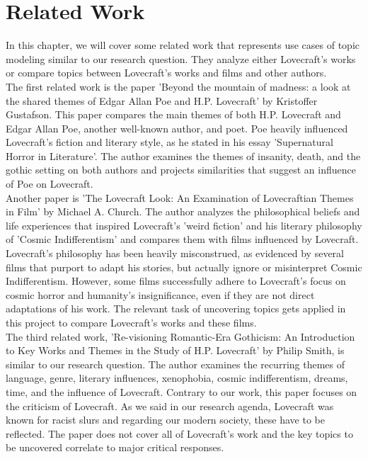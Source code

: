 \section{Related Work}

In this chapter, we will cover some related work that represents use cases of topic modeling 
similar to our research question. They analyze either Lovecraft's works or compare topics 
between Lovecraft's works and films and other authors.\\

The first related work is the paper 'Beyond the mountain of madness: a look at the shared 
themes of Edgar Allan Poe and H.P. Lovecraft' by Kristoffer Gustafson. This paper compares 
the main themes of both H.P. Lovecraft and Edgar Allan Poe, another well-known author, and 
poet. Poe heavily influenced Lovecraft's fiction and literary style, as he stated in his essay 
'Supernatural Horror in Literature'. The author examines the themes of insanity, death, and the 
gothic setting on both authors and projects similarities that suggest an influence of Poe on 
Lovecraft.\\

Another paper is 'The Lovecraft Look: An Examination of Lovecraftian Themes in Film' by 
Michael A. Church. The author analyzes the philosophical beliefs and life experiences that 
inspired Lovecraft's 'weird fiction' and his literary philosophy of 'Cosmic Indifferentism' 
and compares them with films influenced by Lovecraft. Lovecraft's philosophy has been heavily 
misconstrued, as evidenced by several films that purport to adapt his stories, but actually 
ignore or misinterpret Cosmic Indifferentism. However, some films successfully adhere to 
Lovecraft's focus on cosmic horror and humanity's insignificance, even if they are not direct 
adaptations of his work. The relevant task of uncovering topics gets applied in this project 
to compare Lovecraft's works and these films.\\

The third related work, 'Re-visioning Romantic-Era Gothicism: An Introduction to Key Works 
and Themes in the Study of H.P. Lovecraft' by Philip Smith, is similar to our research 
question. The author examines the recurring themes of language, genre, literary influences, 
xenophobia, cosmic indifferentism, dreams, time, and the influence of Lovecraft. Contrary 
to our work, this paper focuses on the criticism of Lovecraft. As we said in our research 
agenda, Lovecraft was known for racist slurs and regarding our modern society, these have 
to be reflected. The paper does not cover all of Lovecraft's work and the key topics to be 
uncovered correlate to major critical responses.